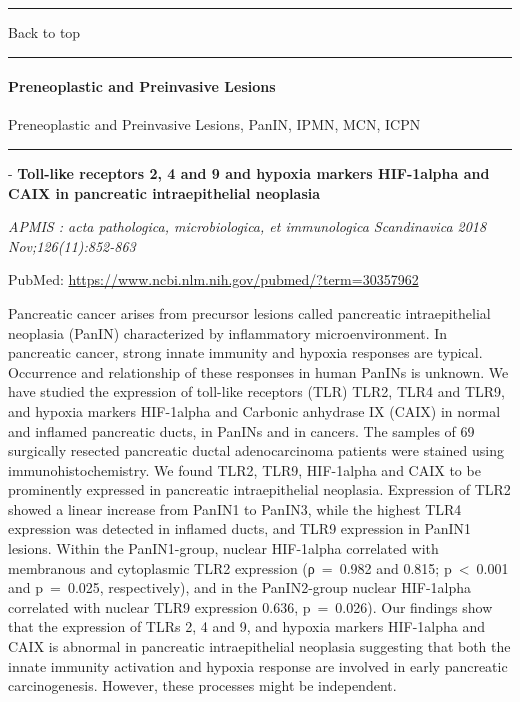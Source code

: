 \documentclass[]{article}
\let\oldparagraph\paragraph
\renewcommand{\paragraph}[1]{\oldparagraph{#1}\mbox{}}
\begin{document}
{}

{}

\begin{center}\rule{0.5\linewidth}{\linethickness}\end{center}

Back to top

\begin{center}\rule{0.5\linewidth}{\linethickness}\end{center}

\pagebreak

\hypertarget{preneoplastic-and-preinvasive-lesions}{%
\paragraph{Preneoplastic and Preinvasive
Lesions}\label{preneoplastic-and-preinvasive-lesions}}

Preneoplastic and Preinvasive Lesions, PanIN, IPMN, MCN, ICPN

\begin{center}\rule{0.5\linewidth}{\linethickness}\end{center}

 - \textbf{Toll-like receptors 2, 4 and 9 and hypoxia markers HIF-1alpha
and CAIX in pancreatic intraepithelial neoplasia}

\emph{APMIS : acta pathologica, microbiologica, et immunologica
Scandinavica 2018 Nov;126(11):852-863}

PubMed: \url{https://www.ncbi.nlm.nih.gov/pubmed/?term=30357962}

Pancreatic cancer arises from precursor lesions called pancreatic
intraepithelial neoplasia (PanIN) characterized by inflammatory
microenvironment. In pancreatic cancer, strong innate immunity and
hypoxia responses are typical. Occurrence and relationship of these
responses in human PanINs is unknown. We have studied the expression of
toll-like receptors (TLR) TLR2, TLR4 and TLR9, and hypoxia markers
HIF-1alpha and Carbonic anhydrase IX (CAIX) in normal and inflamed
pancreatic ducts, in PanINs and in cancers. The samples of 69 surgically
resected pancreatic ductal adenocarcinoma patients were stained using
immunohistochemistry. We found TLR2, TLR9, HIF-1alpha and CAIX to be
prominently expressed in pancreatic intraepithelial neoplasia.
Expression of TLR2 showed a linear increase from PanIN1 to PanIN3, while
the highest TLR4 expression was detected in inflamed ducts, and TLR9
expression in PanIN1 lesions. Within the PanIN1-group, nuclear
HIF-1alpha correlated with membranous and cytoplasmic TLR2 expression
(ρ~=~0.982 and 0.815; p~\textless{}~0.001 and p~=~0.025, respectively),
and in the PanIN2-group nuclear HIF-1alpha correlated with nuclear TLR9
expression 0.636, p~=~0.026). Our findings show that the expression of
TLRs 2, 4 and 9, and hypoxia markers HIF-1alpha and CAIX is abnormal in
pancreatic intraepithelial neoplasia suggesting that both the innate
immunity activation and hypoxia response are involved in early
pancreatic carcinogenesis. However, these processes might be
independent.
\end{document}
